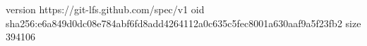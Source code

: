 version https://git-lfs.github.com/spec/v1
oid sha256:e6a849d0dc08e784abf6fd8add4264112a0c635c5fec8001a630aaf9a5f23fb2
size 394106
